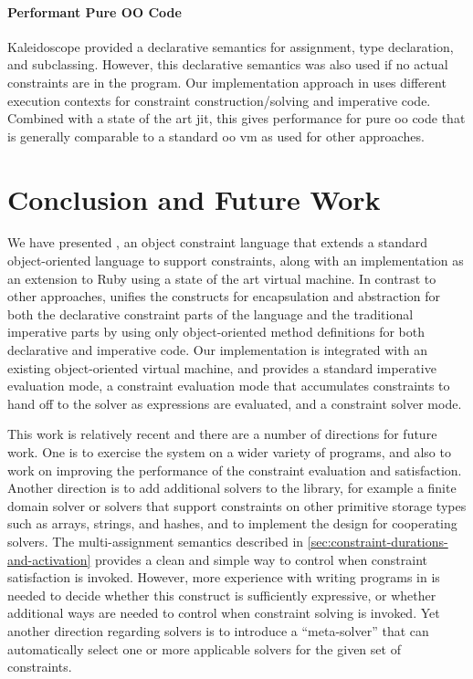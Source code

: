 \paragraph{Performant Pure OO Code}
Kaleidoscope provided a declarative semantics for assignment, type
declaration, and subclassing. However, this declarative semantics was
also used if no actual constraints are in the program. Our
implementation approach in \toolname uses different execution contexts
for constraint construction/solving and imperative code. Combined with
a state of the art \ac{jit}, this gives performance for pure \ac{oo}
code that is generally comparable to a standard \ac{oo} \ac{vm} as used for
other approaches.

\section{Conclusion and Future Work}
\label{sec:conclusion}
We have presented \langname, an object constraint language that extends
a standard object-oriented language to support constraints, along with
an implementation as an extension to Ruby using a state of the art
virtual machine.  In contrast to other approaches, \langname unifies
the constructs for encapsulation and abstraction for both the
declarative constraint parts of the language and the traditional
imperative parts by using only object-oriented method definitions for
both declarative and imperative code.  Our implementation is
integrated with an existing object-oriented virtual machine, and
provides a standard imperative evaluation mode, a constraint
evaluation mode that accumulates constraints to hand off to the solver
as expressions are evaluated, and a constraint solver mode.

This work is relatively recent and there are a number of directions
for future work.  One is to exercise the system on a wider variety of
programs, and also to work on improving the performance of the
constraint evaluation and satisfaction.  Another direction is to add
additional solvers to the library, for example a finite domain solver
or solvers that support constraints on other primitive storage types
such as arrays, strings, and hashes, and to implement the design for
cooperating solvers.  The multi-assignment semantics described in
\autoref{sec:constraint-durations-and-activation} provides a clean and
simple way to control when constraint satisfaction is invoked.
However, more experience with writing programs in \toolname is needed
to decide whether this construct is sufficiently expressive, or
whether additional ways are needed to control when constraint solving
is invoked.  Yet another direction regarding solvers is to introduce a
``meta-solver'' that can automatically select one or more applicable
solvers for the given set of constraints.

